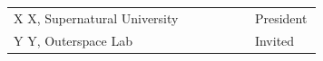 \begin{titlepage}
\vfill %


\begin{center}
\end{center}

\begin{center}
\vspace*{0.2cm}
\noindent \Large
\begin{tabular}{p{0.75\linewidth}p{0.21\linewidth}}
X X, Supernatural University & President \\
Y Y, Outerspace Lab &  Invited
\end{tabular}
\end{center}

\end{titlepage} 